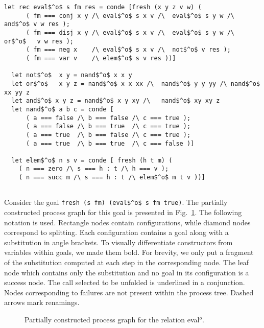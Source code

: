 \begin{figure*}[!t]
  \centering
  \begin{minipage}{0.95\textwidth}
    \begin{lstlisting}[label={eval:whole}, caption={Evaluator of propositional formulas}, captionpos=b, frame=tb]
  let rec eval$^o$ s fm res = conde [fresh (x y z v w) (
      ( fm === conj x y /\ eval$^o$ s x v /\  eval$^o$ s y w /\  and$^o$ v w res );
      ( fm === disj x y /\ eval$^o$ s x v /\  eval$^o$ s y w /\  or$^o$   v w res );
      ( fm === neg x    /\ eval$^o$ s x v /\  not$^o$ v res );
      ( fm === var v    /\ elem$^o$ s v res ))]

  let not$^o$  x y = nand$^o$ x x y
  let or$^o$   x y z = nand$^o$ x x xx /\  nand$^o$ y y yy /\ nand$^o$ xx yy z
  let and$^o$ x y z = nand$^o$ x y xy /\   nand$^o$ xy xy z
  let nand$^o$ a b c = conde [
      ( a === false /\ b === false /\ c === true );
      ( a === false /\ b === true  /\ c === true );
      ( a === true  /\ b === false /\ c === true );
      ( a === true  /\ b === true  /\ c === false )]

  let elem$^o$ n s v = conde [ fresh (h t m) (
    ( n === zero /\ s === h : t /\ h === v );
    ( n === succ m /\ s === h : t /\ elem$^o$ m t v ))]


    \end{lstlisting}
  \end{minipage}
\end{figure*}

Consider the goal \lstinline{fresh (s fm) (eval$^o$ s fm true)}.
The partially constructed process graph for this goal is presented in Fig.~\ref{fig:evalTree}.
The following notation is used.
Rectangle nodes contain configurations, while diamond nodes correspond to splitting.
Each configuration contains a goal along with a substitution in angle brackets.
To visually differentiate constructors from variables within goals, we made them bold.
For brevity, we only put a fragment of the substitution computed at each step in the corresponding node.
The leaf node which contains only the substitution and no goal in its configuration is a success node.
The call selected to be unfolded is underlined in a conjunction.
Nodes corresponding to failures are not present within the process tree.
Dashed arrows mark renamings.

\begin{figure}[!t]
  \centering
  \begin{minipage}{0.95\textwidth}
    
  \end{minipage}
  \caption{Partially constructed process graph for the relation eval$^o$.}
  \label{fig:evalTree}
\end{figure}


